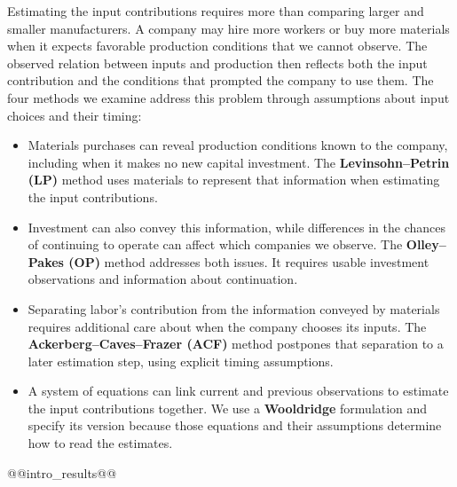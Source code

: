 Estimating the input contributions requires more than comparing larger and smaller manufacturers. A company may hire more workers or buy more materials when it expects favorable production conditions that we cannot observe. The observed relation between inputs and production then reflects both the input contribution and the conditions that prompted the company to use them. The four methods we examine address this problem through assumptions about input choices and their timing:
\begin{itemize}
\item Materials purchases can reveal production conditions known to the company, including when it makes no new capital investment. The \textbf{Levinsohn--Petrin (LP)} method uses materials to represent that information when estimating the input contributions.
\item Investment can also convey this information, while differences in the chances of continuing to operate can affect which companies we observe. The \textbf{Olley--Pakes (OP)} method addresses both issues. It requires usable investment observations and information about continuation.
\item Separating labor's contribution from the information conveyed by materials requires additional care about when the company chooses its inputs. The \textbf{Ackerberg--Caves--Frazer (ACF)} method postpones that separation to a later estimation step, using explicit timing assumptions.
\item A system of equations can link current and previous observations to estimate the input contributions together. We use a \textbf{Wooldridge} formulation and specify its version because those equations and their assumptions determine how to read the estimates.
\end{itemize}

@@intro_results@@

